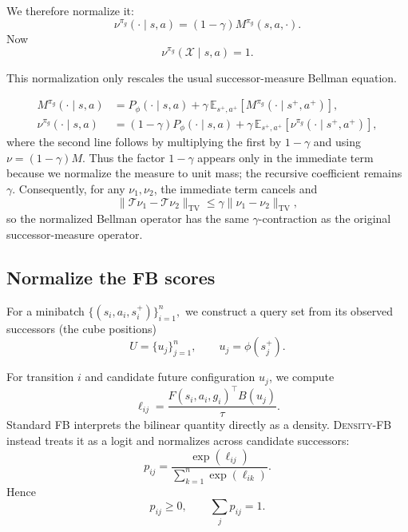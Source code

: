 \documentclass{article}
\newcommand{\E}{\mathbb{E}}
\newcommand{\DensityFB}{\textsc{Density-FB}}
\begin{document}
We therefore normalize it:
\begin{equation}
\label{eq:normalized-sm}
    \nu^{\pi_g}(\cdot\mid s,a) = (1-\gamma) M^{\pi_g}(s,a,\cdot).
\end{equation}
Now
\begin{equation}
\nu^{\pi_g}(\mathcal X\mid s,a)=1.
\end{equation}

This normalization only rescales the usual successor-measure Bellman equation.

\begin{align}
    M^{\pi_g}(\cdot\mid s,a)    &= P_\phi(\cdot\mid s,a) + \gamma\,\E_{s^+,a^+} \left[ M^{\pi_g}(\cdot\mid s^+,a^+) \right], \\
    \nu^{\pi_g}(\cdot\mid s,a)  &= (1-\gamma)P_\phi(\cdot\mid s,a) + \gamma\,\E_{s^+,a^+} \left[ \nu^{\pi_g}(\cdot\mid s^+,a^+) \right],
\label{eq:normalized-bellman}
\end{align}
where the second line follows by multiplying the first by $1-\gamma$ and using $\nu=(1-\gamma)M$.
Thus the factor $1-\gamma$ appears only in the immediate term because we normalize the measure to unit mass; the recursive coefficient remains $\gamma$.
Consequently, for any $\nu_1,\nu_2$, the immediate term cancels and
\begin{equation}
    \|\mathcal T\nu_1-\mathcal T\nu_2\|_{\mathrm{TV}} \le \gamma\|\nu_1-\nu_2\|_{\mathrm{TV}},
\end{equation}
so the normalized Bellman operator has the same $\gamma$-contraction as the original successor-measure operator.

\subsection{Normalize the FB scores}

For a minibatch $\{(s_i,a_i,s_i^+)\}_{i=1}^n,$ we construct a query set from its observed successors (the cube positions)
\begin{equation}
U = \{u_j\}_{j=1}^n, \qquad u_j=\phi(s_j^+).
\end{equation}

For transition $i$ and candidate future configuration $u_j$, we compute
\begin{equation}
\ell_{ij} = \frac{ F(s_i,a_i,g_i)^\top B(u_j) }{\tau}.
\end{equation}
Standard FB interprets the bilinear quantity directly as a density.
\DensityFB{} instead treats it as a logit and normalizes across candidate successors:
\begin{equation}
\label{eq:density-softmax}
p_{ij} = \frac{ \exp(\ell_{ij}) }{ \sum_{k=1}^n \exp(\ell_{ik})}.
\end{equation}
Hence
\begin{equation}
p_{ij}\ge0, \qquad \sum_j p_{ij}=1.
\end{equation}
\end{document}
